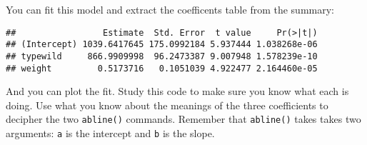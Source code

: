 \documentclass[]{book}
\newenvironment{Shaded}{\begin{snugshade}}{\end{snugshade}}
\newcommand{\KeywordTok}[1]{\textcolor[rgb]{0.13,0.29,0.53}{\textbf{#1}}}
\newcommand{\DataTypeTok}[1]{\textcolor[rgb]{0.13,0.29,0.53}{#1}}
\newcommand{\DecValTok}[1]{\textcolor[rgb]{0.00,0.00,0.81}{#1}}
\newcommand{\FloatTok}[1]{\textcolor[rgb]{0.00,0.00,0.81}{#1}}
\newcommand{\StringTok}[1]{\textcolor[rgb]{0.31,0.60,0.02}{#1}}
\newcommand{\OperatorTok}[1]{\textcolor[rgb]{0.81,0.36,0.00}{\textbf{#1}}}
\newcommand{\NormalTok}[1]{#1}
\theoremstyle{definition}
\theoremstyle{definition}
\theoremstyle{definition}
\theoremstyle{remark}
\begin{document}
You can fit this model and extract the coefficents table from the
summary:

\begin{Shaded}
\end{Shaded}

\begin{verbatim}
##                 Estimate  Std. Error  t value     Pr(>|t|)
## (Intercept) 1039.6417645 175.0992184 5.937444 1.038268e-06
## typewild     866.9909998  96.2473387 9.007948 1.578239e-10
## weight         0.5173716   0.1051039 4.922477 2.164460e-05
\end{verbatim}

And you can plot the fit. Study this code to make sure you know what
each is doing. Use what you know about the meanings of the three
coefficients to decipher the two \texttt{abline()} commands. Remember
that \texttt{abline()} takes takes two arguments: \texttt{a} is the
intercept and \texttt{b} is the slope.

\begin{Shaded}
\end{Shaded}
\end{document}
